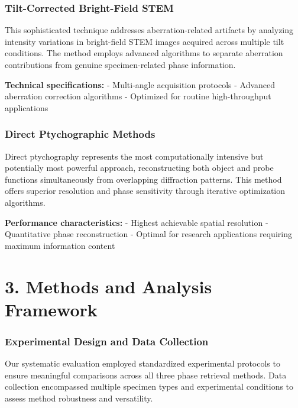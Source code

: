 \documentclass[
  letterpaper,
]{book}
\begin{document}
\subsection{Tilt-Corrected Bright-Field
STEM}\label{tilt-corrected-bright-field-stem}

This sophisticated technique addresses aberration-related artifacts by
analyzing intensity variations in bright-field STEM images acquired
across multiple tilt conditions. The method employs advanced algorithms
to separate aberration contributions from genuine specimen-related phase
information.

\textbf{Technical specifications:} - Multi-angle acquisition protocols -
Advanced aberration correction algorithms - Optimized for routine
high-throughput applications

\subsection{Direct Ptychographic
Methods}\label{direct-ptychographic-methods}

Direct ptychography represents the most computationally intensive but
potentially most powerful approach, reconstructing both object and probe
functions simultaneously from overlapping diffraction patterns. This
method offers superior resolution and phase sensitivity through
iterative optimization algorithms.

\textbf{Performance characteristics:} - Highest achievable spatial
resolution - Quantitative phase reconstruction - Optimal for research
applications requiring maximum information content


\chapter{3. Methods and Analysis
Framework}\label{methods-and-analysis-framework}

\subsection{Experimental Design and Data
Collection}\label{experimental-design-and-data-collection}

Our systematic evaluation employed standardized experimental protocols
to ensure meaningful comparisons across all three phase retrieval
methods. Data collection encompassed multiple specimen types and
experimental conditions to assess method robustness and versatility.
\end{document}
